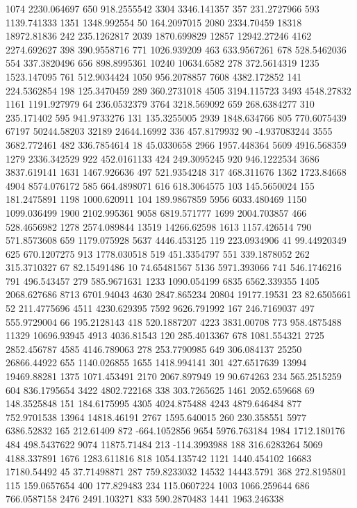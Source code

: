 1074	2230.064697
650	918.2555542
3304	3346.141357
357	231.2727966
593	1139.741333
1351	1348.992554
50	164.2097015
2080	2334.70459
18318	18972.81836
242	235.1262817
2039	1870.699829
12857	12942.27246
4162	2274.692627
398	390.9558716
771	1026.939209
463	633.9567261
678	528.5462036
554	337.3820496
656	898.8995361
10240	10634.6582
278	372.5614319
1235	1523.147095
761	512.9034424
1050	956.2078857
7608	4382.172852
141	224.5362854
198	125.3470459
289	360.2731018
4505	3194.115723
3493	4548.27832
1161	1191.927979
64	236.0532379
3764	3218.569092
659	268.6384277
310	235.171402
595	941.9733276
131	135.3255005
2939	1848.634766
805	770.6075439
67197	50244.58203
32189	24644.16992
336	457.8179932
90	-4.937083244
3555	3682.772461
482	336.7854614
18	45.0330658
2966	1957.448364
5609	4916.568359
1279	2336.342529
922	452.0161133
424	249.3095245
920	946.1222534
3686	3837.619141
1631	1467.926636
497	521.9354248
317	468.311676
1362	1723.84668
4904	8574.076172
585	664.4898071
616	618.3064575
103	145.5650024
155	181.2475891
1198	1000.620911
104	189.9867859
5956	6033.480469
1150	1099.036499
1900	2102.995361
9058	6819.571777
1699	2004.703857
466	528.4656982
1278	2574.089844
13519	14266.62598
1613	1157.426514
790	571.8573608
659	1179.075928
5637	4446.453125
119	223.0934906
41	99.44920349
625	670.1207275
913	1778.030518
519	451.3354797
551	339.1878052
262	315.3710327
67	82.15491486
10	74.65481567
5136	5971.393066
741	546.1746216
791	496.543457
279	585.9671631
1233	1090.054199
6835	6562.339355
1405	2068.627686
8713	6701.94043
4630	2847.865234
20804	19177.19531
23	82.6505661
52	211.4775696
4511	4230.629395
7592	9626.791992
167	246.7169037
497	555.9729004
66	195.2128143
418	520.1887207
4223	3831.00708
773	958.4875488
11329	10696.93945
4913	4036.81543
120	285.4013367
678	1081.554321
2725	2852.456787
4585	4146.789063
278	253.7790985
649	306.084137
25250	26866.44922
655	1140.026855
1655	1418.994141
301	427.6517639
13994	19469.88281
1375	1071.453491
2170	2067.897949
19	90.674263
234	565.2515259
604	836.1795654
3422	4802.722168
338	303.7265625
1461	2052.659668
69	148.3525848
151	184.6175995
4305	4024.875488
4243	4879.646484
877	752.9701538
13964	14818.46191
2767	1595.640015
260	230.358551
5977	6386.52832
165	212.61409
872	-664.1052856
9654	5976.763184
1984	1712.180176
484	498.5437622
9074	11875.71484
213	-114.3993988
188	316.6283264
5069	4188.337891
1676	1283.611816
818	1054.135742
1121	1440.454102
16683	17180.54492
45	37.71498871
287	759.8233032
14532	14443.5791
368	272.8195801
115	159.0657654
400	177.829483
234	115.0607224
1003	1066.259644
686	766.0587158
2476	2491.103271
833	590.2870483
1441	1963.246338
